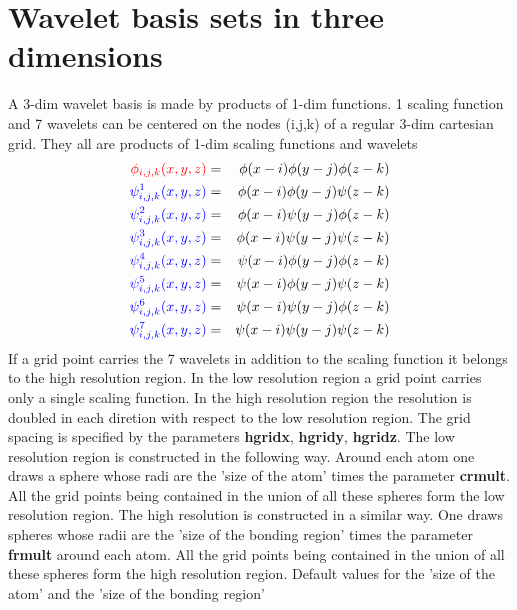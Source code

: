 \documentclass[a4paper,11pt]{report}
\begin{document}
\section{Wavelet basis sets in three dimensions}
A 3-dim wavelet basis is made by products of 1-dim functions.
 {\color{red} 1  scaling function } and {\color{blue} 7 wavelets } 
can be centered on the nodes (i,j,k) of a regular 3-dim cartesian grid.
They all are products of 1-dim scaling functions and wavelets
\begin{eqnarray*}
 {\color{red} \phi_{i,j,k}(x,y,z) }  & = & \phi(x-i) \phi(y-j) \phi(z-k)   \\
 {\color{blue} \psi^1_{i,j,k}(x,y,z) } & = & \phi(x-i) \phi(y-j) \psi(z-k)  \\
 {\color{blue} \psi^2_{i,j,k}(x,y,z) } & = & \phi(x-i) \psi(y-j) \phi(z-k)  \\
 {\color{blue} \psi^3_{i,j,k}(x,y,z) } & = & \phi(x-i) \psi(y-j) \psi(z-k)  \\
 {\color{blue} \psi^4_{i,j,k}(x,y,z) } & = & \psi(x-i) \phi(y-j) \phi(z-k)  \\
 {\color{blue} \psi^5_{i,j,k}(x,y,z) } & = & \psi(x-i) \phi(y-j) \psi(z-k)  \\
 {\color{blue} \psi^6_{i,j,k}(x,y,z) } & = & \psi(x-i) \psi(y-j) \phi(z-k)  \\
 {\color{blue} \psi^7_{i,j,k}(x,y,z) } & = & \psi(x-i) \psi(y-j) \psi(z-k)  \\
\end{eqnarray*}
If a grid point carries the 7 {\color{blue} wavelets} in addition to the {\color{red} scaling function} it belongs 
to the high resolution region. In the low resolution region a grid point carries only 
a single {\color{red} scaling function}. In the high resolution region the resolution is doubled 
in each diretion with respect to the low resolution region. The grid spacing is specified by the parameters
{\bf hgridx}, {\bf hgridy}, {\bf hgridz}. The low resolution region is constructed in the following way. Around each 
atom one draws a sphere whose radi are the 'size of the atom' times the parameter {\bf crmult}. All the grid 
points being contained in the union of all these spheres form the low resolution region. The high resolution is 
constructed in a similar way. One draws spheres whose radii are the 'size of the bonding region' times the 
parameter {\bf frmult} around each atom.  All the grid points being contained in the union of all these spheres 
form the high resolution region. Default values for the 'size of the atom' and  the 'size of the bonding region' 
\end{document}
